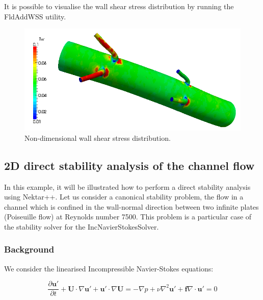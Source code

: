 It is possible to visualise the wall shear stress distribution by running the FldAddWSS utility.

\begin{figure}
\begin{center}
\includegraphics[width=12cm]{Figures/WSS.png}
\caption{Non-dimensional wall shear stress distribution.}
\end{center}
\end{figure}

 \subsection{2D direct stability analysis of the channel flow}

  In this example, it will be illustrated how to perform a direct stability analysis using Nektar++. Let us consider a canonical stability problem, the flow in a channel which is confined in the wall-normal direction between two infinite plates (Poiseuille flow) at Reynolds number 7500. This problem is a particular case of the stability solver for the IncNavierStokesSolver.

 \subsubsection{Background}

  We consider the linearised Incompressible Navier-Stokes equations:

  \begin{subequations}
  \begin{equation}
    \frac{\partial \mathbf{u'}}{\partial t} + \mathbf{U} \cdot  \nabla \mathbf{u'}+\mathbf{u'} \cdot \nabla \mathbf{U} = -\nabla p + \nu \nabla^2 \mathbf{u'} + \mathbf{f}
  \end{equation}

  \begin{equation}
  \nabla \cdot \mathbf{u'} = 0
  \end{equation}
  \end{subequations}

